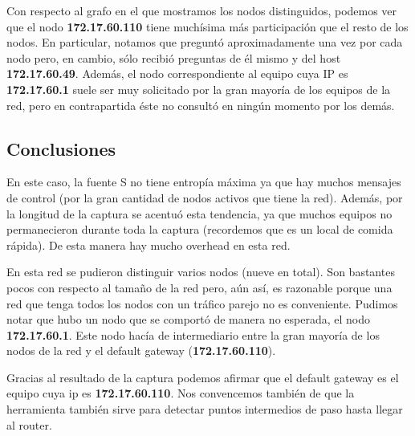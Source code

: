\par Con respecto al grafo en el que mostramos los nodos distinguidos, podemos ver que el nodo \textbf{172.17.60.110} tiene muchísima más participación que el resto de los nodos. En particular, notamos que preguntó aproximadamente una vez por cada nodo pero, en cambio, sólo recibió preguntas de él mismo y del host \textbf{172.17.60.49}. Además, el nodo correspondiente al equipo cuya IP es \textbf{172.17.60.1} suele ser muy solicitado por la gran mayoría de los equipos de la red, pero en contrapartida éste no consultó en ningún momento por los demás.

\subsection{Conclusiones}
\par En este caso, la fuente S no tiene entropía máxima ya que hay muchos mensajes de control (por la gran cantidad de nodos activos que tiene la red). Además, por la longitud de la captura se acentuó esta tendencia, ya que muchos equipos no permanecieron durante toda la captura (recordemos que es un local de comida rápida). De esta manera hay mucho overhead en esta red.
\par En esta red se pudieron distinguir varios nodos (nueve en total). Son bastantes pocos con respecto al tamaño de la red pero, aún así, es razonable porque una red que tenga todos los nodos con un tráfico parejo no es conveniente. Pudimos notar que hubo un nodo que se comportó de manera no esperada, el nodo \textbf{172.17.60.1}. Este nodo hacía de intermediario entre la gran mayoría de los nodos de la red y el default gateway (\textbf{172.17.60.110}).
\par Gracias al resultado de la captura podemos afirmar que el default gateway es el equipo cuya ip es \textbf{172.17.60.110}. Nos convencemos también de que la herramienta también sirve para detectar puntos intermedios de paso hasta llegar al router.
